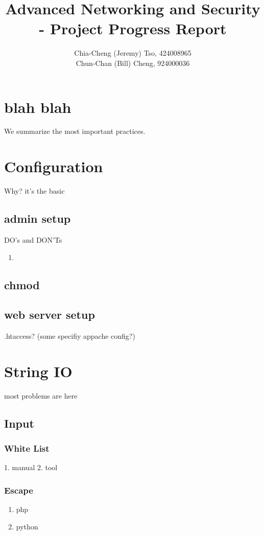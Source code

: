 \documentclass[12pt, a4paper]{article}
\title{
    Advanced Networking and Security\\
    - Project Progress Report 
    \vspace{-2ex}
}
\author{
    \normalfont \normalsize 
    Chia-Cheng (Jeremy) Tso, 
    424008965\\
    \normalfont \normalsize 
    Chun-Chan (Bill) Cheng, 
    924000036
}
\date{
    \normalfont \normalsize 
    \vspace{-5ex}
}
\begin{document}
\maketitle
\section{blah blah}
We summarize the most important practices.

\section{Configuration}
Why? it's the basic

\subsection{admin setup}
DO's and DON'Ts
\begin{enumerate}[label=\textbf{\arabic*.}]
    \item
\end{enumerate}

\subsection{chmod}

\subsection{web server setup}
.htaccess?
(some specifiy appache config?)

\section{String IO}
most problems are here

\subsection{Input}
\subsubsection{White List}
1. manual
2. tool
\subsubsection{Escape}
\begin{enumerate}[label=\textbf{\arabic*.}]
    \item php
    \item python
\end{enumerate}
\end{document}
